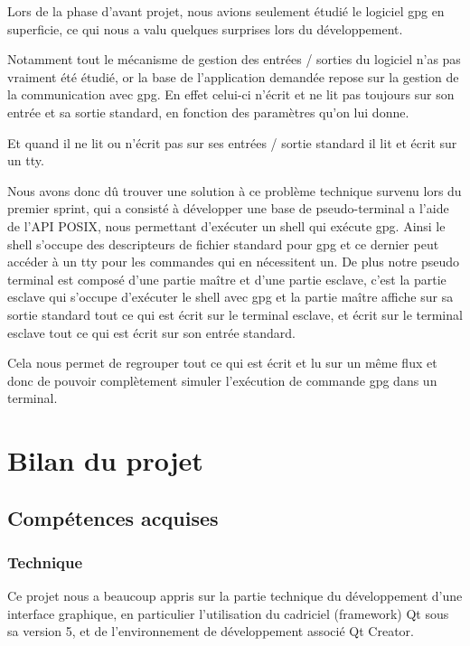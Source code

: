 \documentclass{../res/univ-projet}
\begin{document}
      Lors de la phase d'avant projet, nous avions seulement étudié le logiciel gpg
      en superficie, ce qui nous a valu quelques surprises lors du développement.

      Notamment tout le mécanisme de gestion des entrées / sorties du logiciel n'as pas vraiment été
      étudié, or la base de l'application demandée repose sur la gestion de la communication avec
      gpg.
      En effet celui-ci n'écrit et ne lit pas toujours sur son entrée et sa sortie standard,
      en fonction des paramètres qu'on lui donne.

      Et quand il ne lit ou n'écrit pas sur ses entrées / sortie standard il lit et écrit sur un
      tty.

      Nous avons donc dû trouver une solution à ce problème technique survenu lors du premier sprint,
      qui a consisté à développer une base de pseudo-terminal a l'aide de l'API POSIX, nous permettant
      d'exécuter un shell qui exécute gpg.
      Ainsi le shell s'occupe des descripteurs de fichier standard pour gpg et ce dernier peut accéder à un tty
      pour les commandes qui en nécessitent un.
      De plus notre pseudo terminal est composé d'une partie maître et d'une partie esclave,
      c'est la partie esclave qui s'occupe d'exécuter le shell avec gpg et la partie maître affiche
      sur sa sortie standard tout ce qui est écrit sur le terminal esclave, 
      et écrit sur le terminal esclave tout ce qui est écrit sur son entrée standard.

      Cela nous permet de regrouper tout ce qui est écrit et lu sur un même flux et donc de pouvoir
      complètement simuler l'exécution de commande gpg dans un terminal.
  

\section{Bilan du projet}
  
  \subsection{Compétences acquises}

    \subsubsection{Technique}
    
      Ce projet nous a beaucoup appris sur la partie technique du développement d'une interface graphique, en particulier l'utilisation du cadriciel (framework) Qt sous sa version 5, et de l'environnement de développement associé Qt Creator.
\end{document}
